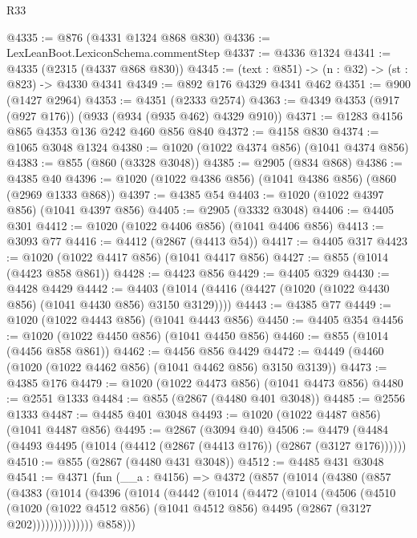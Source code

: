 \begin{lexlean}{R33}
\begin{coremodule}
@4335 := @876 (@4331 @1324 @868 @830)
@4336 := LexLeanBoot.LexiconSchema.commentStep
@4337 := @4336 @1324
@4341 := @4335 (@2315 (@4337 @868 @830))
@4345 := (text : @851) -> (n : @32) -> (st : @823) -> @4330 @4341
@4349 := @892 @176 @4329 @4341 @462
@4351 := @900 (@1427 @2964)
@4353 := @4351 (@2333 @2574)
@4363 := @4349 @4353 (@917 (@927 @176)) (@933 (@934 (@935 @462) @4329 @910))
@4371 := @1283 @4156 @865 @4353 @136 @242 @460 @856 @840
@4372 := @4158 @830
@4374 := @1065 @3048 @1324
@4380 := @1020 (@1022 @4374 @856) (@1041 @4374 @856)
@4383 := @855 (@860 (@3328 @3048))
@4385 := @2905 (@834 @868)
@4386 := @4385 @40
@4396 := @1020 (@1022 @4386 @856) (@1041 @4386 @856) (@860 (@2969 @1333 @868))
@4397 := @4385 @54
@4403 := @1020 (@1022 @4397 @856) (@1041 @4397 @856)
@4405 := @2905 (@3332 @3048)
@4406 := @4405 @301
@4412 := @1020 (@1022 @4406 @856) (@1041 @4406 @856)
@4413 := @3093 @77
@4416 := @4412 (@2867 (@4413 @54))
@4417 := @4405 @317
@4423 := @1020 (@1022 @4417 @856) (@1041 @4417 @856)
@4427 := @855 (@1014 (@4423 @858 @861))
@4428 := @4423 @856
@4429 := @4405 @329
@4430 := @4428 @4429
@4442 := @4403 (@1014 (@4416 (@4427 (@1020 (@1022 @4430 @856) (@1041 @4430 @856) @3150 @3129))))
@4443 := @4385 @77
@4449 := @1020 (@1022 @4443 @856) (@1041 @4443 @856)
@4450 := @4405 @354
@4456 := @1020 (@1022 @4450 @856) (@1041 @4450 @856)
@4460 := @855 (@1014 (@4456 @858 @861))
@4462 := @4456 @856 @4429
@4472 := @4449 (@4460 (@1020 (@1022 @4462 @856) (@1041 @4462 @856) @3150 @3139))
@4473 := @4385 @176
@4479 := @1020 (@1022 @4473 @856) (@1041 @4473 @856)
@4480 := @2551 @1333
@4484 := @855 (@2867 (@4480 @401 @3048))
@4485 := @2556 @1333
@4487 := @4485 @401 @3048
@4493 := @1020 (@1022 @4487 @856) (@1041 @4487 @856)
@4495 := @2867 (@3094 @40)
@4506 := @4479 (@4484 (@4493 @4495 (@1014 (@4412 (@2867 (@4413 @176)) (@2867 (@3127 @176))))))
@4510 := @855 (@2867 (@4480 @431 @3048))
@4512 := @4485 @431 @3048
@4541 := @4371
    (fun (__a : @4156) =>
    @4372
      (@857
        (@1014
          (@4380
            (@857
              (@4383
                (@1014
                  (@4396
                    (@1014
                      (@4442
                        (@1014
                          (@4472
                            (@1014
                              (@4506
                                (@4510
                                  (@1020
                                    (@1022 @4512 @856)
                                    (@1041 @4512 @856)
                                    @4495
                                    (@2867 (@3127 @202))))))))))))))
            @858)))

\end{coremodule}
\end{lexlean}
